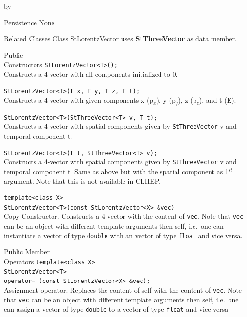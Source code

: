 \documentclass[twoside]{article}
\newcommand{\comp}[1]{\texttt{#1}}%
\newcommand{\entrylabel}[1]{\mbox{\textbf{{#1}}}\hfil}%
\newenvironment{entry}
{\begin{list}{}%
    {\renewcommand{\makelabel}{\entrylabel}%
     \setlength{\labelwidth}{90pt}%
     \setlength{\leftmargin}{\labelwidth}
     \advance\leftmargin by \labelsep%
      }%
    }%
  {\end{list}}
\newcommand{\Entrylabel}[1]%
{\raisebox{0pt}[1ex][0pt]{\makebox[\labelwidth][l]%
    {\parbox[t]{\labelwidth}{\hspace{0pt}\textbf{{#1}}}}}}
\newenvironment{Entry}%
{\renewcommand{\entrylabel}{\Entrylabel}\begin{entry}}%
  {\end{entry}}
\begin{document}
\begin{Entry}
\item[Persistence]
    None

\item[Related Classes]
    Class StLorentzVector uses {\bf StThreeVector}
    as data member.

\item[Public\\ Constructors]
    \verb+StLorentzVector<T>();+ \\
    Constructs a 4-vector with all components initialized to 0.
    
    \verb+StLorentzVector<T>(T x, T y, T z, T t);+ \\
    Constructs a 4-vector with given
    components x (p$_{x}$), y (p$_{y}$), z (p$_{z}$),
    and t (E).

    \verb+StLorentzVector<T>(StThreeVector<T> v, T t);+ \\
    Constructs a 4-vector with spatial components given by
    \comp{StThreeVector} v and temporal component t.

    \verb+StLorentzVector<T>(T t, StThreeVector<T> v);+ \\
    Constructs a 4-vector with spatial components given by
    \comp{StThreeVector} v and temporal component t.
    Same as above but with the spatial component as 1$^{st}$ argument.
    Note that this is not available in CLHEP.
        
    \verb+template<class X>+\\
    \verb+StLorentzVector<T>(const StLorentzVector<X> &vec)+\\
    Copy Constructor. Constructs a 4-vector with the content of \comp{vec}.
    Note that \comp{vec} can be an object with different
    template arguments then self, i.e.~one can instantiate
    a vector of type \comp{double} with an vector of type
    \comp{float} and vice versa.   
    
\item[Public Member\\ Operators]
    \verb+template<class X>+\\
    \verb+StLorentzVector<T>+\\
    \verb+operator= (const StLorentzVector<X> &vec);+ \\
    Assignment operator. Replaces the content of self with the content of \comp{vec}.
    Note that \comp{vec} can be an object with different
    template arguments then self, i.e.~one can assign
    a vector of type \comp{double} to a vector of type
    \comp{float} and vice versa.  
    

\end{Entry}
\end{document}
